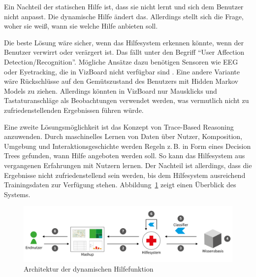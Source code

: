 \documentclass[
	headsepline,
	footsepline,
	fontsize=12pt,
	bibliography=totoc
]{scrbook}
\begin{document}
Ein Nachteil der statischen Hilfe ist, dass sie nicht lernt und sich dem Benutzer nicht anpasst. Die dynamische Hilfe ändert das. Allerdings stellt sich die Frage, woher sie weiß, wann sie welche Hilfe anbieten soll.


Die beste Lösung wäre sicher, wenn das Hilfesystem erkennen könnte, wenn der Benutzer verwirrt oder verärgert ist. Das fällt unter den Begriff \enquote{User Affection Detection/Recognition}. Mögliche Ansätze dazu benötigen Sensoren wie EEG oder Eyetracking, die in VizBoard nicht verfügbar sind \cite{Li2005, Liao2006}. Eine andere Variante wäre Rückschlüsse auf den Gemütszustand des Benutzers mit Hidden Markov Models \cite{Rabiner1986} zu ziehen. Allerdings könnten in VizBoard nur Mausklicks und Tastaturanschläge als Beobachtungen verwendet werden, was vermutlich nicht zu zufriedenstellenden Ergebnissen führen würde.


Eine zweite Lösungsmöglichkeit ist das Konzept von Trace-Based Reasoning \cite{Cordier2013} anzuwenden. Durch maschinelles Lernen \cite{Kotsiantis2007} von Daten über Nutzer, Komposition, Umgebung und Interaktionsgeschichte werden Regeln z.\,B. in Form eines Decision Trees gefunden, wann Hilfe angeboten werden soll. So kann das Hilfesystem aus vergangenen Erfahrungen mit Nutzern lernen. Der Nachteil ist allerdings, dass die Ergebnisse nicht zufriedenstellend sein werden, bis dem Hilfesystem ausreichend Trainingsdaten zur Verfügung stehen. Abbildung~\ref{figure:architektur-dynhilfe} zeigt einen Überblick des Systems.

\begin{figure}[htbp]
   \centering
   \includegraphics[width=\textwidth]{images/konzeption-architektur-dynhilfe.png}
   \caption{Architektur der dynamischen Hilfefunktion}
   \label{figure:architektur-dynhilfe}
\end{figure}
\end{document}
